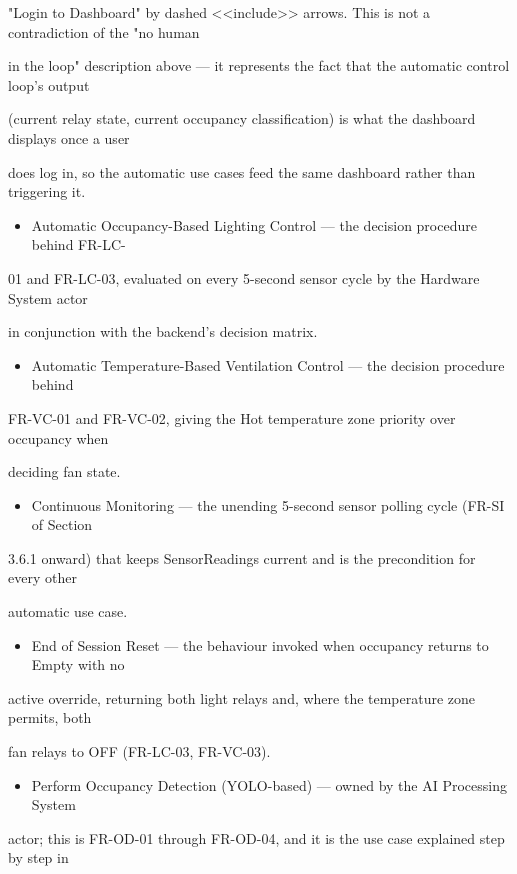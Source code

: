 "Login to Dashboard" by dashed <<include>> arrows. This is not a contradiction of the "no human

in the loop" description above --- it represents the fact that the automatic control loop's output

(current relay state, current occupancy classification) is what the dashboard displays once a user

does log in, so the automatic use cases feed the same dashboard rather than triggering it.

\begin{itemize}
	\item Automatic Occupancy-Based Lighting Control --- the decision procedure behind FR-LC-
\end{itemize}
01 and FR-LC-03, evaluated on every 5-second sensor cycle by the Hardware System actor

in conjunction with the backend's decision matrix.

\begin{itemize}
	\item Automatic Temperature-Based Ventilation Control --- the decision procedure behind
\end{itemize}
FR-VC-01 and FR-VC-02, giving the Hot temperature zone priority over occupancy when

deciding fan state.

\begin{itemize}
	\item Continuous Monitoring --- the unending 5-second sensor polling cycle (FR-SI of Section
\end{itemize}
3.6.1 onward) that keeps SensorReadings current and is the precondition for every other

automatic use case.

\begin{itemize}
	\item End of Session Reset --- the behaviour invoked when occupancy returns to Empty with no
\end{itemize}
active override, returning both light relays and, where the temperature zone permits, both

fan relays to OFF (FR-LC-03, FR-VC-03).

\begin{itemize}
	\item Perform Occupancy Detection (YOLO-based) --- owned by the AI Processing System
\end{itemize}
actor; this is FR-OD-01 through FR-OD-04, and it is the use case explained step by step in

